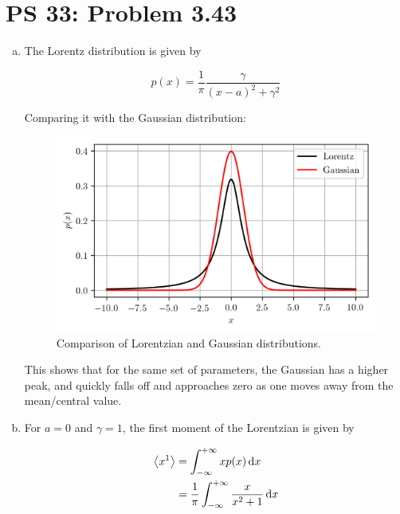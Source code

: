 \documentclass[12pt,a4paper,twocolumn]{article}
\begin{document}
\setcounter{page}{1}

\section*{PS 33: Problem 3.43}
\bigskip

\begin{enumerate}[(a)]

\item The Lorentz distribution is given by

\begin{equation}\label{eq:lorentz}
	p(x) = \frac{1}{\pi}\frac{\gamma}{(x-a)^2 + \gamma^2}
\end{equation}

Comparing it with the Gaussian distribution:

\begin{figure}[!h]
	\centering
	\includegraphics[width=\linewidth]{lorentz.png}
	\caption{Comparison of Lorentzian and Gaussian distributions.}
	\label{fig:compare}
\end{figure}

This shows that for the same set of parameters, the Gaussian has a higher peak, and quickly falls off and approaches zero as one moves away from the mean/central value.

\item For $a = 0$ and $\gamma = 1$, the first moment of the Lorentzian is given by

\begin{align}
	\ev{x^1} &= \int_{-\infty}^{+\infty} xp(x) \dd{x} \\
	&= \frac{1}{\pi} \int_{-\infty}^{+\infty} \frac{x}{x^2 + 1} \dd{x} \nonumber
\end{align}


\end{enumerate}
\end{document}
